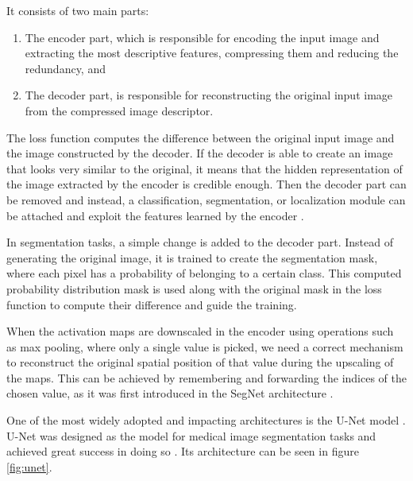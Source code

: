 It consists of two main parts:

\begin{enumerate}
    \item The encoder part, which is responsible for encoding the input image and extracting the most descriptive features, compressing them and reducing the redundancy, and
    \item The decoder part, is responsible for reconstructing the original input image from the compressed image descriptor.
\end{enumerate}

The loss function computes the difference between the original input image and the image constructed by the decoder. If the decoder is able to create an image that looks very similar to the original, it means that the hidden representation of the image extracted by the encoder is credible enough. Then the decoder part can be removed and instead, a classification, segmentation, or localization module can be attached and exploit the features learned by the encoder \cite{Santosh2022-2}.

In segmentation tasks, a simple change is added to the decoder part. Instead of generating the original image, it is trained to create the segmentation mask, where each pixel has a probability of belonging to a certain class. This computed probability distribution mask is used along with the original mask in the loss function to compute their difference and guide the training.

When the activation maps are downscaled in the encoder using operations such as max pooling, where only a single value is picked, we need a correct mechanism to reconstruct the original spatial position of that value during the upscaling of the maps. This can be achieved by remembering and forwarding the indices of the chosen value, as it was first introduced in the SegNet architecture \cite{Badrinarayanan2017}.

One of the most widely adopted and impacting architectures is the U-Net model \cite{Ronneberger2015}. U-Net was designed as the model for medical image segmentation tasks and achieved great success in doing so \cite{Santosh2022-3, Siddique2021}. Its architecture can be seen in figure \ref{fig:unet}.

